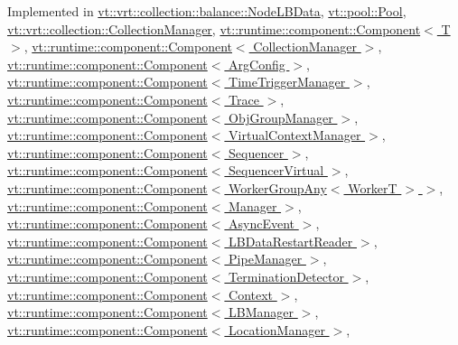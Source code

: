 Implemented in \hyperlink{structvt_1_1vrt_1_1collection_1_1balance_1_1_node_l_b_data_ac62cac77080f79e73e303c42ad850155}{vt\+::vrt\+::collection\+::balance\+::\+Node\+L\+B\+Data}, \hyperlink{structvt_1_1pool_1_1_pool_a45a2880809625a77bb93c3dfcd9c7603}{vt\+::pool\+::\+Pool}, \hyperlink{structvt_1_1vrt_1_1collection_1_1_collection_manager_afafcdbf36f42835471218b654252031c}{vt\+::vrt\+::collection\+::\+Collection\+Manager}, \hyperlink{structvt_1_1runtime_1_1component_1_1_component_a098e362de01af6054e5491fba671a959}{vt\+::runtime\+::component\+::\+Component$<$ T $>$}, \hyperlink{structvt_1_1runtime_1_1component_1_1_component_a098e362de01af6054e5491fba671a959}{vt\+::runtime\+::component\+::\+Component$<$ Collection\+Manager $>$}, \hyperlink{structvt_1_1runtime_1_1component_1_1_component_a098e362de01af6054e5491fba671a959}{vt\+::runtime\+::component\+::\+Component$<$ Arg\+Config $>$}, \hyperlink{structvt_1_1runtime_1_1component_1_1_component_a098e362de01af6054e5491fba671a959}{vt\+::runtime\+::component\+::\+Component$<$ Time\+Trigger\+Manager $>$}, \hyperlink{structvt_1_1runtime_1_1component_1_1_component_a098e362de01af6054e5491fba671a959}{vt\+::runtime\+::component\+::\+Component$<$ Trace $>$}, \hyperlink{structvt_1_1runtime_1_1component_1_1_component_a098e362de01af6054e5491fba671a959}{vt\+::runtime\+::component\+::\+Component$<$ Obj\+Group\+Manager $>$}, \hyperlink{structvt_1_1runtime_1_1component_1_1_component_a098e362de01af6054e5491fba671a959}{vt\+::runtime\+::component\+::\+Component$<$ Virtual\+Context\+Manager $>$}, \hyperlink{structvt_1_1runtime_1_1component_1_1_component_a098e362de01af6054e5491fba671a959}{vt\+::runtime\+::component\+::\+Component$<$ Sequencer $>$}, \hyperlink{structvt_1_1runtime_1_1component_1_1_component_a098e362de01af6054e5491fba671a959}{vt\+::runtime\+::component\+::\+Component$<$ Sequencer\+Virtual $>$}, \hyperlink{structvt_1_1runtime_1_1component_1_1_component_a098e362de01af6054e5491fba671a959}{vt\+::runtime\+::component\+::\+Component$<$ Worker\+Group\+Any$<$ Worker\+T $>$ $>$}, \hyperlink{structvt_1_1runtime_1_1component_1_1_component_a098e362de01af6054e5491fba671a959}{vt\+::runtime\+::component\+::\+Component$<$ Manager $>$}, \hyperlink{structvt_1_1runtime_1_1component_1_1_component_a098e362de01af6054e5491fba671a959}{vt\+::runtime\+::component\+::\+Component$<$ Async\+Event $>$}, \hyperlink{structvt_1_1runtime_1_1component_1_1_component_a098e362de01af6054e5491fba671a959}{vt\+::runtime\+::component\+::\+Component$<$ L\+B\+Data\+Restart\+Reader $>$}, \hyperlink{structvt_1_1runtime_1_1component_1_1_component_a098e362de01af6054e5491fba671a959}{vt\+::runtime\+::component\+::\+Component$<$ Pipe\+Manager $>$}, \hyperlink{structvt_1_1runtime_1_1component_1_1_component_a098e362de01af6054e5491fba671a959}{vt\+::runtime\+::component\+::\+Component$<$ Termination\+Detector $>$}, \hyperlink{structvt_1_1runtime_1_1component_1_1_component_a098e362de01af6054e5491fba671a959}{vt\+::runtime\+::component\+::\+Component$<$ Context $>$}, \hyperlink{structvt_1_1runtime_1_1component_1_1_component_a098e362de01af6054e5491fba671a959}{vt\+::runtime\+::component\+::\+Component$<$ L\+B\+Manager $>$}, \hyperlink{structvt_1_1runtime_1_1component_1_1_component_a098e362de01af6054e5491fba671a959}{vt\+::runtime\+::component\+::\+Component$<$ Location\+Manager $>$}, 